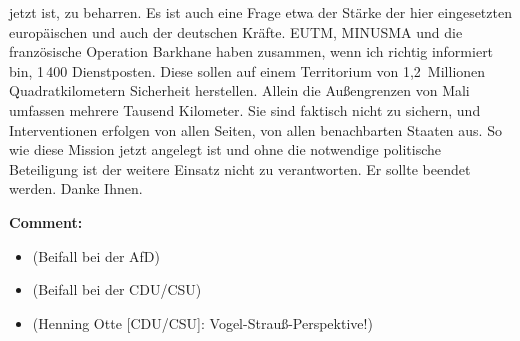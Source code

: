 \documentclass{article}
\begin{document}
jetzt ist, zu beharren. Es ist auch eine Frage etwa der Stärke der hier eingesetzten europäischen und auch der deutschen Kräfte. EUTM, MINUSMA und die französische Operation Barkhane haben zusammen, wenn ich richtig informiert bin, 1 400 Dienstposten. Diese sollen auf einem Territorium von 1,2 Millionen Quadratkilometern Sicherheit herstellen. Allein die Außengrenzen von Mali umfassen mehrere Tausend Kilometer. Sie sind faktisch nicht zu sichern, und Interventionen erfolgen von allen Seiten, von allen benachbarten Staaten aus. So wie diese Mission jetzt angelegt ist und ohne die notwendige politische Beteiligung ist der weitere Einsatz nicht zu verantworten. Er sollte beendet werden. Danke Ihnen.  

\noindent\textbf{Comment:}
\begin{itemize}
    \setlength\itemsep{-3pt}
    \item (Beifall bei der AfD)
    \setlength\itemsep{-3pt}
    \item (Beifall bei der CDU/CSU)
    \setlength\itemsep{-3pt}
    \item (Henning Otte [CDU/CSU]: Vogel-Strauß-Perspektive!)
\end{itemize}
\end{document}
